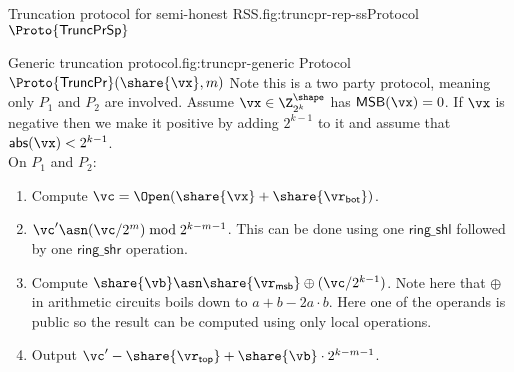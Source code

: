 \begin{Boxfig}{Truncation protocol for semi-honest
RSS.}{fig:truncpr-rep-ss}{Protocol $\Proto{\mathsf{TruncPrSp}}$}
\end{Boxfig}

\begin{Boxfig}{Generic truncation protocol.}{fig:truncpr-generic}
  {Protocol $\Proto{\mathsf{TruncPr}}(\share{\vx}, m)$}
  Note this is a two party protocol, meaning only $P_1$ and $P_2$ are involved.
  Assume $\vx \in \Z_{2^k}^{\shape}$ has $\mathsf{MSB}(\vx) = 0$. If $\vx$ is negative then
  we make it positive by adding $2^{k-1}$ to it and assume that $\mathsf{abs}(\vx) < 2^{k-1}$.
  \\
  On $P_1$ and $P_2$:
  \begin{enumerate}
    \item Compute $\vc = \Open(\share{\vx} + \share{\vr_{\mathsf{bot}}})$.
    \item $\vc' \asn (\vc/2^m) \bmod 2^{k-m-1}$. This can be done using one $\mathsf{ring\_shl}$
    followed by one $\mathsf{ring\_shr}$ operation.
    \item Compute $\share{\vb} \asn \share{\vr_{\mathsf{msb}}} \oplus (\vc / 2^{k-1})$. Note here that $\oplus$
    in arithmetic circuits boils down to $a + b - 2a\cdot b$. Here one of the operands is public so
    the result can be computed using only local operations.
    \item Output $\vc' - \share{\vr_{\mathsf{top}}} + \share{\vb} \cdot 2^{k-m-1}$.
 \end{enumerate}

\end{Boxfig}


